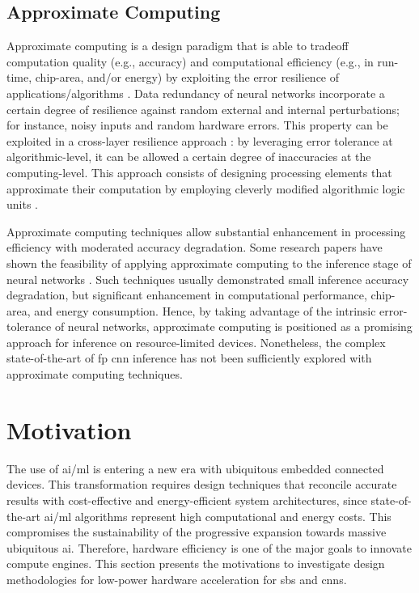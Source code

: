 \subsection{Approximate Computing}
Approximate computing is a design paradigm that is able to tradeoff computation quality (e.g., accuracy) and computational efficiency (e.g., in run-time, chip-area, and/or energy) by exploiting the error resilience of applications/algorithms \cite{gillani2020exploiting, zhang2015approxann}. Data redundancy of neural networks incorporate a certain degree of resilience against random external and internal perturbations;
 for instance, noisy inputs and random hardware errors. This property can be exploited in a cross-layer resilience approach \cite{carter2010design}: by leveraging error tolerance at algorithmic-level, it can be allowed a certain degree of inaccuracies at the computing-level. This approach consists of designing processing elements that approximate their computation by employing cleverly modified algorithmic logic units \cite{han2013approximate}.

Approximate computing techniques allow substantial enhancement in processing efficiency with moderated accuracy degradation. Some research papers have shown the feasibility of applying approximate computing to the inference stage of neural networks \cite{lotrivc2012applicability, han2013approximate, du2014leveraging, mrazek2016design, sarwar2016multiplier, zervakis2021approximate}. Such techniques usually demonstrated small inference accuracy degradation, but significant enhancement in computational performance, chip-area, and energy consumption. Hence, by taking advantage of the intrinsic error-tolerance of neural networks, approximate computing is positioned as a promising approach for inference on resource-limited devices. Nonetheless, the complex state-of-the-art of \gls{fp} \gls{cnn} inference has not been sufficiently explored with approximate computing techniques.

\section{Motivation}\label{chap1.motivation}
The use of \gls{ai}/\gls{ml} is entering a new era with ubiquitous embedded connected devices. This transformation requires design techniques that reconcile accurate results with cost-effective and energy-efficient system architectures, since state-of-the-art \gls{ai}/\gls{ml} algorithms represent high computational and energy costs. This compromises the sustainability of the progressive expansion towards massive ubiquitous \gls{ai}. Therefore, hardware efficiency is one of the major goals to innovate compute engines. This section presents the motivations to investigate design methodologies for low-power hardware acceleration for \gls{sbs} and \glspl{cnn}.

